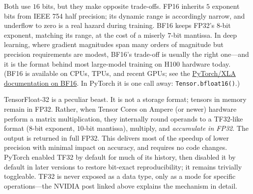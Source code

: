 \documentclass[11pt,a4paper]{article}
\theoremstyle{definition}
\theoremstyle{remark}
\theoremstyle{plain}
\begin{document}
\begin{description}[leftmargin=1.5em, style=nextline]
    \item[FP16 vs.\ BF16.] Both use $16$ bits, but they make opposite
        trade-offs. FP16 inherits $5$ exponent bits from IEEE 754 half
        precision; its dynamic range is accordingly narrow, and
        underflow to zero is a real hazard during training. BF16 keeps
        FP32's $8$-bit exponent, matching its range, at the cost of a
        miserly $7$-bit mantissa. In deep learning, where gradient
        magnitudes span many orders of magnitude but precision
        requirements are modest, BF16's trade-off is usually the right
        one---and it is the format behind most large-model training on
        H100 hardware today. (BF16 is available on CPUs, TPUs, and recent
        GPUs; see the
        \href{http://pytorch.org/xla/release/1.9/index.html\#xla-tensors-and-bfloat16}{PyTorch/XLA
        documentation on BF16}. In PyTorch it is one call away:
        \texttt{Tensor.bfloat16()}.)
    \item[TF32.] TensorFloat-32 is a peculiar beast. It is not a storage
        format; tensors in memory remain in FP32. Rather, when Tensor
        Cores on Ampere (or newer) hardware perform a matrix
        multiplication, they internally round operands to a TF32-like
        format ($8$-bit exponent, $10$-bit mantissa), multiply, and
        \emph{accumulate in FP32}. The output is returned in full FP32.
        This delivers most of the speedup of lower precision with minimal
        impact on accuracy, and requires no code changes. PyTorch enabled
        TF32 by default for much of its history, then disabled it by
        default in later versions to restore bit-exact reproducibility;
        it remains trivially toggleable. TF32 is never exposed as a data
        type, only as a mode for specific operations---the NVIDIA post
        linked above explains the mechanism in detail.
\end{description}
\end{document}
